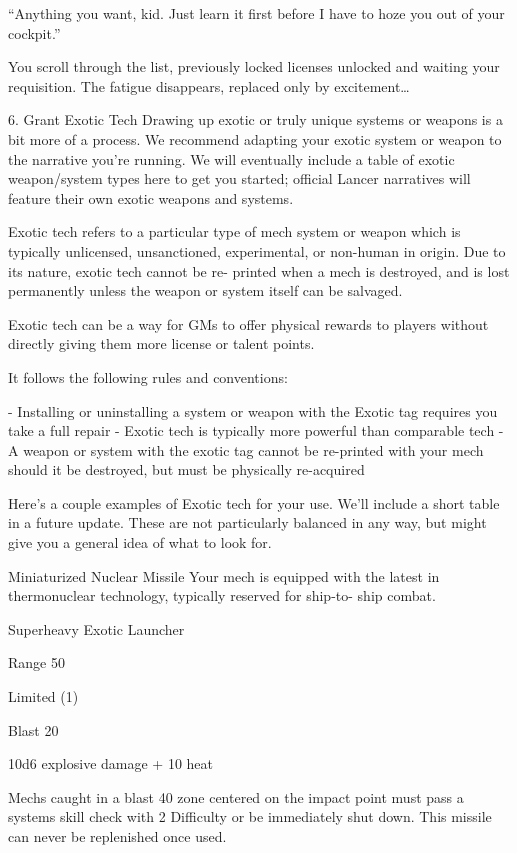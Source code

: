 “Anything you want, kid. Just learn it first before I have to hoze you out of your cockpit.”




You scroll through the list, previously locked licenses unlocked and waiting your requisition. The
fatigue disappears, replaced only by excitement…

6. Grant Exotic Tech
Drawing up exotic or truly unique systems or weapons is a bit more of a process. We
recommend adapting your exotic system or weapon to the narrative you’re running. We will
eventually include a table of exotic weapon/system types here to get you started; official Lancer
narratives will feature their own exotic weapons and systems.


Exotic tech refers to a particular type of mech system or weapon which is typically unlicensed,
unsanctioned, experimental, or non-human in origin. Due to its nature, exotic tech cannot be re-
printed when a mech is destroyed, and is lost permanently unless the weapon or system itself
can be salvaged.


Exotic tech can be a way for GMs to offer physical rewards to players without directly giving
them more license or talent points.


 It follows the following rules and conventions:

    -    Installing or uninstalling a system or weapon with the Exotic tag requires you take a full
         repair
    -    Exotic tech is typically more powerful than comparable tech
    -    A weapon or system with the exotic tag cannot be re-printed with your mech should it
         be destroyed, but must be physically re-acquired

Here’s a couple examples of Exotic tech for your use. We’ll include a short table in a future
update. These are not particularly balanced in any way, but might give you a general idea of what
to look for.


Miniaturized Nuclear Missile
Your mech is equipped with the latest in thermonuclear technology, typically reserved for ship-to-
ship combat.

Superheavy Exotic Launcher

Range 50

Limited (1)

Blast 20

10d6 explosive damage + 10 heat


Mechs caught in a blast 40 zone centered on the impact point must pass a systems skill check
with 2 Difficulty or be immediately shut down. This missile can never be replenished once used.


